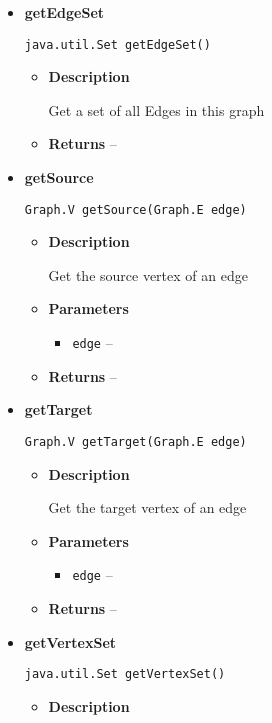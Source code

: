{{{{{\begin{itemize}
{\begin{itemize}
{}%
\end{itemize}
}%
\item{ 
{\bf  getEdgeSet}\\
\begin{lstlisting}[frame=none]
java.util.Set getEdgeSet()\end{lstlisting} %
\begin{itemize}
\item{
{\bf  Description}

Get a set of all Edges in this graph
}
\item{{\bf  Returns} -- 
 
}%
\end{itemize}
}%
\item{ 
{\bf  getSource}\\
\begin{lstlisting}[frame=none]
Graph.V getSource(Graph.E edge)\end{lstlisting} %
\begin{itemize}
\item{
{\bf  Description}

Get the source vertex of an edge
}
\item{
{\bf  Parameters}
  \begin{itemize}
   \item{
\texttt{edge} -- }
  \end{itemize}
}%
\item{{\bf  Returns} -- 
 
}%
\end{itemize}
}%
\item{ 
{\bf  getTarget}\\
\begin{lstlisting}[frame=none]
Graph.V getTarget(Graph.E edge)\end{lstlisting} %
\begin{itemize}
\item{
{\bf  Description}

Get the target vertex of an edge
}
\item{
{\bf  Parameters}
  \begin{itemize}
   \item{
\texttt{edge} -- }
  \end{itemize}
}%
\item{{\bf  Returns} -- 
 
}%
\end{itemize}
}%
\item{ 
{\bf  getVertexSet}\\
\begin{lstlisting}[frame=none]
java.util.Set getVertexSet()\end{lstlisting} %
\begin{itemize}
\item{
{\bf  Description}

}
\end{itemize}}
\end{itemize}}}}}}
